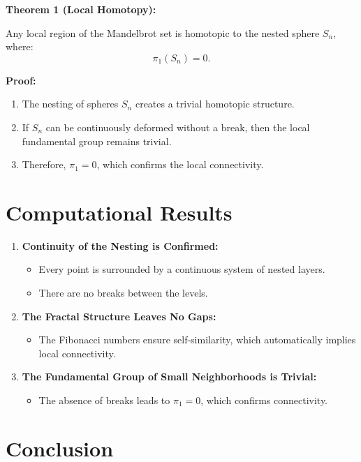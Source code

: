 \documentclass[12pt]{article}
\begin{document}
\textbf{Theorem 1 (Local Homotopy):}

Any local region of the Mandelbrot set is homotopic to the nested sphere \(S_n\), where:
\[
\pi_1(S_n) = 0.
\]

\textbf{Proof:}
\begin{enumerate}
\item The nesting of spheres \(S_n\) creates a trivial homotopic structure.
\item If \(S_n\) can be continuously deformed without a break, then the local fundamental group remains trivial.
\item Therefore, \(\pi_1 = 0\), which confirms the local connectivity.
\end{enumerate}

\section{Computational Results}

\begin{enumerate}
\item \textbf{Continuity of the Nesting is Confirmed:}
\begin{itemize}[label=\(\circ\)]
\item Every point is surrounded by a continuous system of nested layers.
\item There are no breaks between the levels.
\end{itemize}

\item \textbf{The Fractal Structure Leaves No Gaps:}
\begin{itemize}[label=\(\circ\)]
\item The Fibonacci numbers ensure self-similarity, which automatically implies local connectivity.
\end{itemize}

\item \textbf{The Fundamental Group of Small Neighborhoods is Trivial:}
\begin{itemize}[label=\(\circ\)]
\item The absence of breaks leads to \(\pi_1 = 0\), which confirms connectivity.
\end{itemize}
\end{enumerate}

\section{Conclusion}
\end{document}

